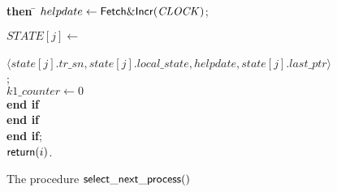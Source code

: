 \begin{figure}[htb]
{{\begin{minipage}[t]{150mm}
\begin{tabbing}
 \>\>\>\>\>\> \> \> {\bf then} \=
        $helpdate \leftarrow {\sf Fetch\&Incr}(\mathit{CLOCK})$; \\

 \>\>\>\>\>\> \>\> \>

$\mathit{STATE}[j]\leftarrow$\\

 \>\>\>\>\>\> \>\> \> ~~~~
    $\langle state[j].tr\_sn, state[j].local\_state, helpdate, 
                                          state[j].last\_ptr \rangle$ \\

 \>\>\>\>\>\> ; \\

 \>\>\>\>\>\> $k1\_counter \leftarrow 0$\\


 \>\>\>\>\>  {\bf end if}\\

 \>\>\> {\bf end if}\\

  \>   {\bf end if};\\ 

 \>   ${\sf return}(i)$.  %


\end{tabbing}
\normalsize
\end{minipage}
}
\caption{The procedure ${\sf select\_next\_process}()$}
\label{fig:select-next-proc}
}
\end{figure}

